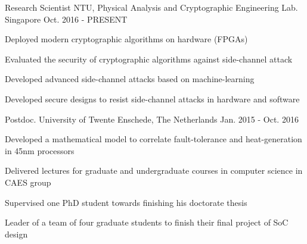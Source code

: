 

\begin{cventries}

  \cventry
    {Research Scientist} %
    {NTU, Physical Analysis and Cryptographic Engineering Lab.} %
    {Singapore} %
    {Oct. 2016 - PRESENT} %
    {
      \begin{cvitems} %
	\item {Deployed modern cryptographic algorithms on hardware (FPGAs)}
        \item {Evaluated the security of cryptographic algorithms against side-channel attack}
        \item {Developed advanced side-channel attacks based on machine-learning}
        \item {Developed secure designs to resist side-channel attacks in hardware and software}
      \end{cvitems}
    }

  \cventry
    {Postdoc.} %
    {University of Twente} %
    {Enschede, The Netherlands} %
    {Jan. 2015 - Oct. 2016} %
    {
      \begin{cvitems} %
        \item {Developed a mathematical model to correlate fault-tolerance and heat-generation in 45nm processors}
        \item {Delivered lectures for graduate and undergraduate courses in computer science in CAES group}
	\item {Supervised one PhD student towards finishing his doctorate thesis}
	\item {Leader of a team of four graduate students to finish their final project of SoC design}
      \end{cvitems}
    }


\end{cventries}
